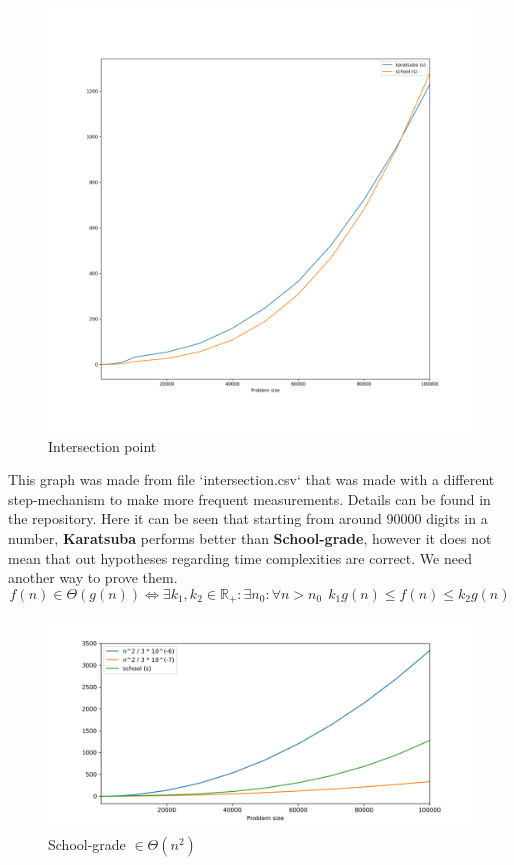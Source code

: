 \documentclass[12pt, oneside]{article}
\begin{document}
\begin{figure}[h]
\caption{Intersection point}
\centering
\includegraphics[width=1\textwidth]{intersection_square}
\end{figure}
This graph was made from file `intersection.csv` that was made with a different step-mechanism to make more frequent measurements. Details can be found in the repository.
  Here it can be seen that starting from around 90000 digits in a number, \textbf{Karatsuba} performs better than \textbf{School-grade}, however it does not mean that out hypotheses regarding time complexities are correct. We need another way to prove them.
\[f(n) \in \Theta(g(n)) \iff \exists k_1, k_2 \in \mathbb{R}_+:  \exists n_0: \forall n > n_0 \ \ k_1 g(n) \leq f(n) \leq k_2 g(n) \]  
  \begin{figure}[h]
\caption{School-grade $\in \Theta(n^2)$}

\includegraphics[width=1\textwidth]{O_school}
\end{figure}
\end{document}
